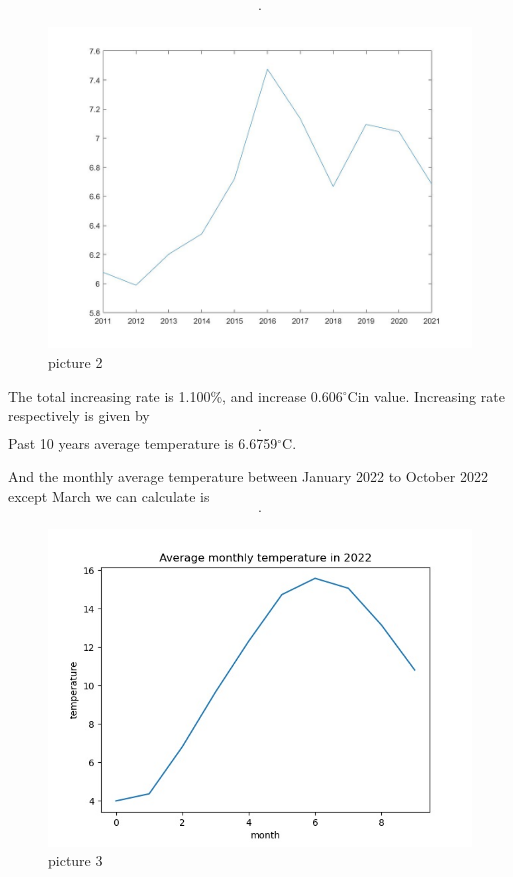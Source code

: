 \documentclass{apmcmthesis}
\def\oc{$^{\circ}$C\;}
\begin{document}
\begin{align*}
  [6.0780,5.9890, 6.2030, 6.3420 , 6.7220 ,7.4750 , 7.1340 , 6.6680 , 7.0950  ,7.0450 ,6.6840].
\end{align*}

\begin{figure}[htbp]
  \centering
  \includegraphics[scale=0.2]{past 10 avg.jpg}
  \caption{picture 2}\label{fig2}
\end{figure}

The total increasing rate is 1.100\%, and increase 0.606\oc in value.
Increasing rate respectively is given by
\begin{align*}
  [ -0.0941,-0.0146,0.0357,0.0224,0.0599,0.1120, -0.0456,-0.0653, 0.0640,-0.0070,-0.0512].
\end{align*}
Past 10 years average temperature is 6.6759\oc. 

And the monthly average temperature between January 2022 to October 2022 except March we can calculate is 
\begin{align*}
  [3.989,  4.358, 6.812,9.665, 12.313, 14.742, 15.588, 15.07 ,13.151, 10.811].
\end{align*}
\begin{figure}[htbp]
  \centering
  \includegraphics[scale=0.35]{Average monthly temperature in 2022.jpg}
  \caption{picture 3}\label{fig3}
\end{figure}
\end{document}
